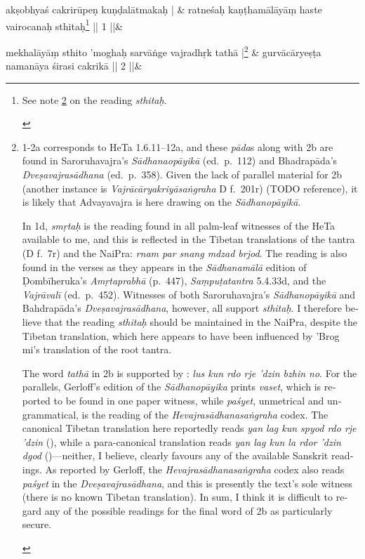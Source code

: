 \documentclass[naipra.tex]{subfiles}
\begin{document}
\begin{sanskrit}
\medskip\versequote
akṣobhyaś cakrirūpeṇ kuṇḍalātmakaḥ | &
ratneśaḥ kaṇṭhamālāyāṃ haste vairocanaḥ sthitaḥ\footnote{\begin{english}
	See note \ref{2bnote} on the reading \emph{sthitaḥ}.
\end{english}} || 1 ||\&


\medskip\versequote
mekhalāyāṃ sthito 'moghaḥ sarvāṅge vajradhṛk tathā |\footnote{\begin{english}
	1-2a corresponds to HeTa 1.6.11–12a, and these \emph{pāda}s along with 2b are found in Saroruhavajra's \emph{Sādhanaopāyikā} (ed.\ p.\ 112) and Bhadrapāda's \emph{Dveṣavajrasādhana} (ed.\ p.\ 358).
	Given the lack of parallel material for 2b (another instance is \emph{Vajrācāryakriyāsaṅgraha} D f.\ 201r) (TODO reference), it is likely that Advayavajra is here drawing on the \emph{Sādhanopāyikā}.
	
	In 1d, \emph{smṛtaḥ} is the reading found in all palm-leaf witnesses of the HeTa available to me, and this is reflected in the Tibetan translations of the tantra (D f.\ 7r) and the NaiPra: \emph{rnam par snang mdzad brjod}.
	The reading is also found in the verses as they appears in the \emph{Sādhanamālā} edition of Ḍombīheruka's \emph{Amṛtaprabhā} (p.\ 447), \emph{Saṃpuṭatantra} 5.4.33d, and the \emph{Vajrāvalī} (ed.\ p.\ 452).
	Witnesses of both Saroruhavajra's \emph{Sādhanopāyikā} and Bahdrapāda's \emph{Dveṣavajrasādhana}, however, all support \emph{sthitaḥ}.
	I therefore believe that the reading \emph{sthitaḥ} should be maintained in the NaiPra, despite the Tibetan translation, which here appears to have been influenced by 'Brog mi's translation of the root tantra.

	The word \emph{tathā} in 2b is supported by \TIB : \emph{lus kun rdo rje 'dzin bzhin no}.
	For the parallels, Gerloff's edition of the \emph{Sādhanopāyika} prints \emph{vaset}, which is reported to be found in one paper witness, while \emph{paśyet}, unmetrical and ungrammatical, is the reading of the \emph{Hevajrasādhanasaṅgraha} codex.
	The canonical Tibetan translation here reportedly reads \emph{yan lag kun spyod rdo rje 'dzin} (\cite[vol.\ 1 135]{gerloff2020}), while a para-canonical translation reads \emph{yan lag kun la rdor 'dzin dgod} (\cite[vol.\ 2 152]{gerloff2020})—neither, I believe, clearly favours any of the available Sanskrit readings.
	As reported by Gerloff, the \emph{Hevajrasādhanasaṅgraha} codex also reads \emph{paśyet} in the \emph{Dveṣavajrasādhana}, and this is presently the text's sole witness (there is no known Tibetan translation).
	In sum, I think it is difficult to regard any of the possible readings for the final word of 2b as particularly secure.
	\label{2bnote}
\end{english}} & 
gurvācāryeṣṭa namanāya śirasi cakrikā || 2 ||\&


\end{sanskrit}
\end{document}
